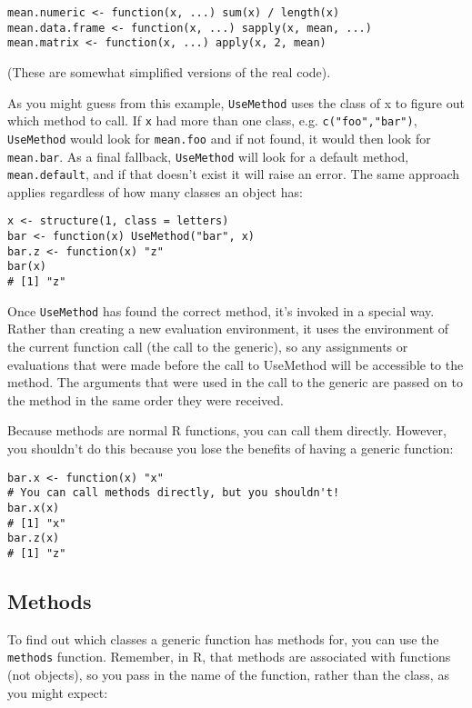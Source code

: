 \begin{verbatim}
mean.numeric <- function(x, ...) sum(x) / length(x)
mean.data.frame <- function(x, ...) sapply(x, mean, ...)
mean.matrix <- function(x, ...) apply(x, 2, mean)
\end{verbatim}

(These are somewhat simplified versions of the real code).

As you might guess from this example, \texttt{UseMethod} uses the class
of x to figure out which method to call. If \texttt{x} had more than one
class, e.g. \texttt{c("foo","bar")}, \texttt{UseMethod} would look for
\texttt{mean.foo} and if not found, it would then look for
\texttt{mean.bar}. As a final fallback, \texttt{UseMethod} will look for
a default method, \texttt{mean.default}, and if that doesn't exist it
will raise an error. The same approach applies regardless of how many
classes an object has:

\begin{verbatim}
x <- structure(1, class = letters)
bar <- function(x) UseMethod("bar", x)
bar.z <- function(x) "z"
bar(x)
# [1] "z"
\end{verbatim}

Once \texttt{UseMethod} has found the correct method, it's invoked in a
special way. Rather than creating a new evaluation environment, it uses
the environment of the current function call (the call to the generic),
so any assignments or evaluations that were made before the call to
UseMethod will be accessible to the method. The arguments that were used
in the call to the generic are passed on to the method in the same order
they were received.

Because methods are normal R functions, you can call them directly.
However, you shouldn't do this because you lose the benefits of having a
generic function:

\begin{verbatim}
bar.x <- function(x) "x"
# You can call methods directly, but you shouldn't!
bar.x(x)
# [1] "x"
bar.z(x)
# [1] "z"
\end{verbatim}

\hypertarget{methods}{%
\subsection{Methods}\label{methods}}

To find out which classes a generic function has methods for, you can
use the \texttt{methods} function. Remember, in R, that methods are
associated with functions (not objects), so you pass in the name of the
function, rather than the class, as you might expect:

